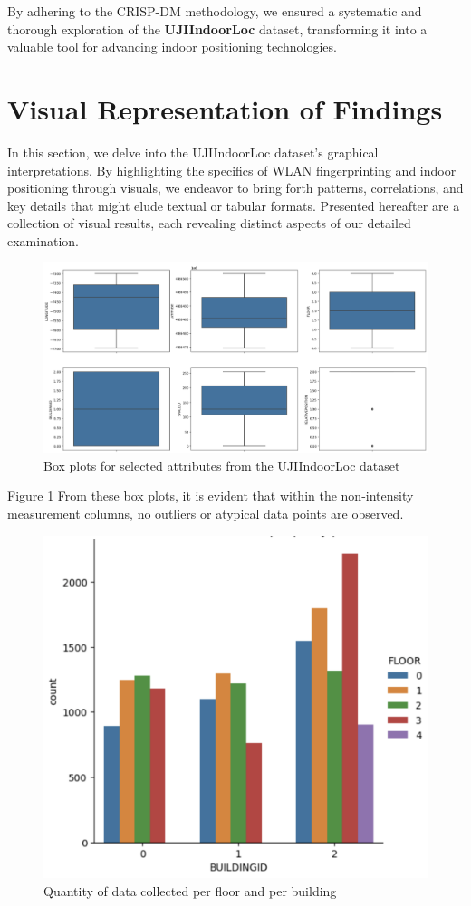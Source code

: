 \documentclass[conference]{IEEEtran}
\begin{document}
By adhering to the CRISP-DM methodology, we ensured a systematic and thorough exploration of the \textbf{UJIIndoorLoc} dataset, transforming it into a valuable tool for advancing indoor positioning technologies.

\section{Visual Representation of Findings}

In this section, we delve into the UJIIndoorLoc dataset's graphical interpretations. By highlighting the specifics of WLAN fingerprinting and indoor positioning through visuals, we endeavor to bring forth patterns, correlations, and key details that might elude textual or tabular formats. Presented hereafter are a collection of visual results, each revealing distinct aspects of our detailed examination.



\begin{figure}[h!]
    \centering
    \includegraphics[width=0.5\linewidth]{Images/Figure1.png}
    \caption{Box plots for selected attributes from the UJIIndoorLoc dataset}
    \label{fig:boxplots}
\end{figure}


Figure 1 From these box plots, it is evident that within the non-intensity measurement columns, no outliers or atypical data points are observed.


\begin{figure}[h!]
    \centering
    \includegraphics[width=0.5\linewidth]{Images/Imagen2.png}
    \caption{Quantity of data collected per floor and per building}
    \label{fig:enter-label}
\end{figure}
\end{document}
